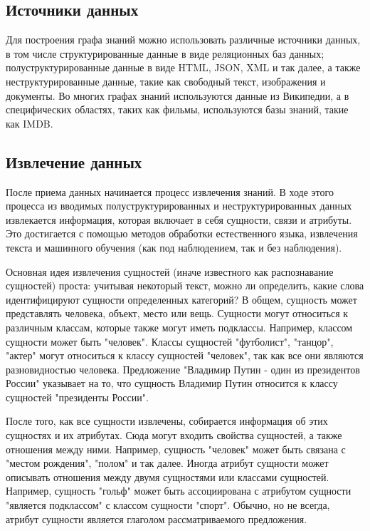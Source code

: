 \subsection{Источники данных}

Для построения графа знаний можно использовать различные источники данных, в том числе структурированные данные в виде реляционных баз
данных; полуструктурированные данные в виде HTML, JSON, XML и так далее, а также неструктурированные данные, такие как свободный текст,
изображения и документы. Во многих графах знаний используются данные из Википедии, а в специфических областях, таких как фильмы,
используются базы знаний, такие как IMDB.

\subsection{Извлечение данных}

После приема данных начинается процесс извлечения знаний. В ходе этого процесса из вводимых полуструктурированных и неструктурированных
данных извлекается информация, которая включает в себя сущности, связи и атрибуты. Это достигается с помощью методов обработки естественного
языка, извлечения текста и машинного обучения (как под наблюдением, так и без наблюдения).

Основная идея извлечения сущностей (иначе известного как распознавание сущностей) проста: учитывая некоторый текст, можно ли определить,
какие слова идентифицируют сущности определенных категорий? В общем, сущность может представлять человека, объект, место или вещь. Сущности
могут относиться к различным классам, которые также могут иметь подклассы. Например, классом сущности может быть "человек". Классы сущностей
"футболист", "танцор", "актер" могут относиться к классу сущностей "человек", так как все они являются разновидностью человека. Предложение
"Владимир Путин - один из президентов России" указывает на то, что сущность Владимир Путин относится к классу сущностей "президенты России".

После того, как все сущности извлечены, собирается информация об этих сущностях и их атрибутах. Сюда могут входить свойства сущностей, а
также отношения между ними. Например, сущность "человек" может быть связана с "местом рождения", "полом" и так далее. Иногда атрибут сущности
может описывать отношения между двумя сущностями или классами сущностей. Например, сущность "гольф" может быть ассоциирована с атрибутом
сущности "является подклассом" с классом сущности "спорт". Обычно, но не всегда, атрибут сущности является глаголом рассматриваемого предложения.

